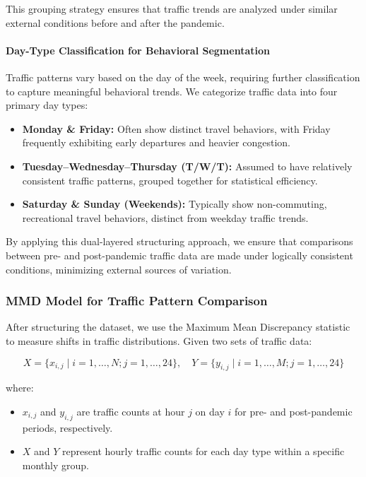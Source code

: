 \documentclass{article}
\begin{document}
This grouping strategy ensures that traffic trends are analyzed under similar external conditions before and after the pandemic.

\paragraph{Day-Type Classification for Behavioral Segmentation}

Traffic patterns vary based on the day of the week, requiring further classification to capture meaningful behavioral trends. We categorize traffic data into four primary day types:

\begin{itemize}
    \item \textbf{Monday \& Friday:} Often show distinct travel behaviors, with Friday frequently exhibiting early departures and heavier congestion.
    \item \textbf{Tuesday–Wednesday–Thursday (T/W/T):} Assumed to have relatively consistent traffic patterns, grouped together for statistical efficiency.
    \item \textbf{Saturday \& Sunday (Weekends):} Typically show non-commuting, recreational travel behaviors, distinct from weekday traffic trends.
\end{itemize}

By applying this dual-layered structuring approach, we ensure that comparisons between pre- and post-pandemic traffic data are made under logically consistent conditions, minimizing external sources of variation.

\subsubsection{MMD Model for Traffic Pattern Comparison}

After structuring the dataset, we use the Maximum Mean Discrepancy statistic to measure shifts in traffic distributions. Given two sets of traffic data:

\[
X = \{x_{i,j} \mid i = 1, \dots, N; j = 1, \dots, 24\}, \quad Y = \{y_{i,j} \mid i = 1, \dots, M; j = 1, \dots, 24\}
\]

where:

\begin{itemize}
    \item $x_{i,j}$ and $y_{i,j}$ are traffic counts at hour $j$ on day $i$ for pre- and post-pandemic periods, respectively.
    \item $X$ and $Y$ represent hourly traffic counts for each day type within a specific monthly group.
\end{itemize}
\end{document}
